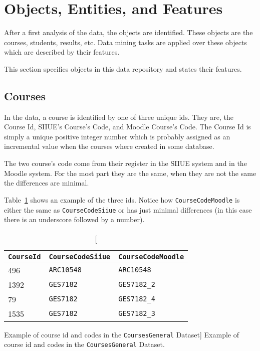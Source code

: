 \section{Objects, Entities, and Features}
\label{sec:objs_ents_feat}

After a first analysis of the data, the objects are identified.  These objects
are the courses, students, results, etc. Data mining tasks are applied over
these objects which are described by their features.

This section specifies objects in this data repository and states their
features.

\subsection{Courses}
\label{sec:data_courses}

In the data, a course is identified by one of three unique ids. They are, the
Course Id, SIIUE's Course's Code, and Moodle Course's Code. The Course Id is
simply a unique positive integer number which is probably assigned as an
incremental value when the courses where created in some database.

The two course's code come from their register in the SIIUE system and in the
Moodle system. For the most part they are the same, when they are not the same
the differences are minimal.

Table~\ref{tab:course_code_example} shows an example of the three ids. Notice
how \texttt{CourseCodeMoodle} is either the same as \texttt{CourseCodeSiiue} or
has just minimal differences (in this case there is an underscore followed by a
number).

\begin{table}[h!]
    \centering

    \begin{tabular}{l l l}
\texttt{CourseId} & \texttt{CourseCodeSiiue} & \texttt{CourseCodeMoodle} \\ \hline
        496       & \texttt{ARC10548}        & \texttt{ARC10548}         \\
        1392      & \texttt{GES7182}         & \texttt{GES7182\_2}       \\
        79        & \texttt{GES7182}         & \texttt{GES7182\_4}       \\
        1535      & \texttt{GES7182}         & \texttt{GES7182\_3}       \\
    \end{tabular}

    \caption
        [Example of course id and codes in the \texttt{CoursesGeneral} Dataset]
        {Example of course id and codes in the \texttt{CoursesGeneral} Dataset.}

    \label{tab:course_code_example}
\end{table}

